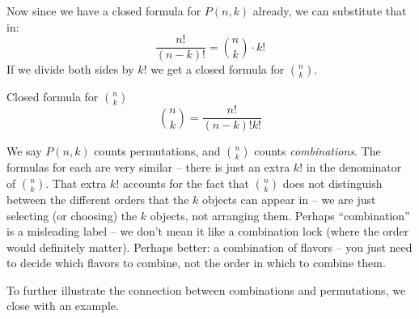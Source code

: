 \documentclass[12pt]{article}
\begin{document}
Now since we have a closed formula for $P(n,k)$ already, we can substitute that in:
\[\frac{n!}{(n-k)!} = {n \choose k} \cdot k!\]
If we divide both sides by $k!$ we get a closed formula for ${n \choose k}$.

\begin{defbox}{Closed formula for ${n \choose k}$}
  \[{n \choose k} = \frac{n!}{(n-k)!k!}\]
\end{defbox}

We say $P(n,k)$ counts permutations, and ${n \choose k}$ counts {\em combinations}.  The formulas for each are very similar -- there is just an extra $k!$ in the denominator of ${n \choose k}$.  That extra $k!$ accounts for the fact that ${n \choose k}$ does not distinguish between the different orders that the $k$ objects can appear in -- we are just selecting (or choosing) the $k$ objects, not arranging them.  Perhaps ``combination'' is a misleading label -- we don't mean it like a combination lock (where the order would definitely matter).  Perhaps better: a combination of flavors -- you just need to decide which flavors to combine, not the order in which to combine them.

To further illustrate the connection between combinations and permutations, we close with an example.
\end{document}
